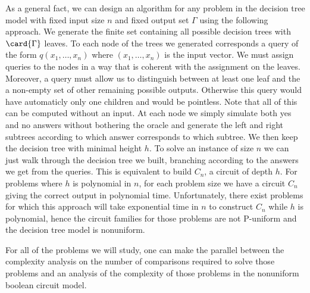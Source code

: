 As a general fact, we can design an algorithm for any problem in the decision
tree model with fixed input size \(n\) and fixed output set \(\Gamma\) using
the following approach. We generate the finite set containing all possible
decision trees with \(\card{\Gamma}\) leaves. To each node of the trees we
generated corresponds a query of the form \(q(x_1,\ldots,x_n)\) where
\((x_1,\ldots,x_n)\) is the input vector. We must assign queries to the nodes
in a way that is coherent with the assignment on the leaves. Moreover, a query
must allow us to distinguish between at least one leaf and the a non-empty set
of other remaining possible outputs. Otherwise this query would have
automaticly only one children and would be pointless. Note that all of this can
be computed without an input. At each node we simply simulate both yes and no
answers without bothering the oracle and generate the left and right subtrees
according to which answer corresponds to which subtree. We then keep the
decision tree with minimal height \(h\). To solve an instance of size \(n\) we
can just walk through the decision tree we built, branching according to the
answers we get from the queries. This is equivalent to build \(C_n\), a circuit
of depth \(h\). For problems where \(h\) is polynomial in \(n\), for each
problem size we have a circuit \(C_n\) giving the correct output in polynomial
time. Unfortunately, there exist problems for which this approach will take
exponential time in \(n\) to construct \(C_n\) while \(h\) is polynomial, hence
the circuit families for those problems are not P-uniform and the decision tree
model is nonuniform.

For all of the problems we will study, one can make the parallel between the
complexity analysis on the number of comparisons required to solve those
problems and an analysis of the complexity of those problems in the nonuniform
boolean circuit model.
